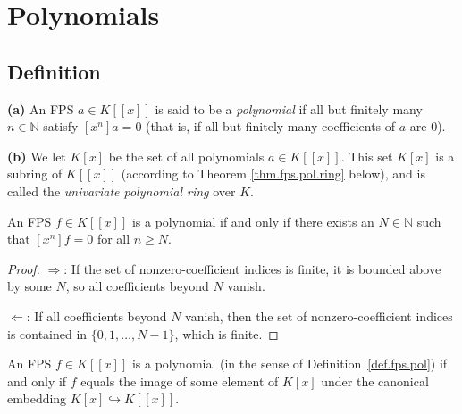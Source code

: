 \section{Polynomials}

\subsection{Definition}

\begin{definition}
\label{def.fps.pol}
\leantarget
\leanok
\textbf{(a)} An FPS $a\in K\left[  \left[  x\right]
\right]  $ is said to be a \emph{polynomial} if all but finitely many
$n\in\mathbb{N}$ satisfy $\left[  x^{n}\right]  a=0$ (that is, if all but
finitely many coefficients of $a$ are $0$). \medskip

\textbf{(b)} We let $K\left[  x\right]  $ be the set of all polynomials $a\in
K\left[  \left[  x\right]  \right]  $. This set $K\left[  x\right]  $ is a
subring of $K\left[  \left[  x\right]  \right]  $ (according to Theorem
\ref{thm.fps.pol.ring} below), and is called the \emph{univariate polynomial
ring} over $K$.
\end{definition}

\begin{lemma}
\label{lem.fps.pol.degree-bound}
\leanhelper
\leanok
An FPS $f\in K\left[\left[x\right]\right]$ is a polynomial if and only if
there exists an $N\in\mathbb{N}$ such that $\left[x^{n}\right]f=0$ for all
$n\geq N$.
\end{lemma}

\begin{proof}
\leanok
$\Longrightarrow$: If the set of nonzero-coefficient indices is finite, it is
bounded above by some $N$, so all coefficients beyond $N$ vanish.

$\Longleftarrow$: If all coefficients beyond $N$ vanish, then the set of
nonzero-coefficient indices is contained in $\{0,1,\ldots,N-1\}$, which is
finite.
\end{proof}

\begin{lemma}
\label{lem.fps.pol.exists-polynomial}
\leanhelper
\leanok
An FPS $f\in K\left[\left[x\right]\right]$ is a polynomial (in the sense of
Definition~\ref{def.fps.pol}) if and only if $f$ equals the image of some
element of $K[x]$ under the canonical embedding $K[x]\hookrightarrow
K\left[\left[x\right]\right]$.
\end{lemma}

